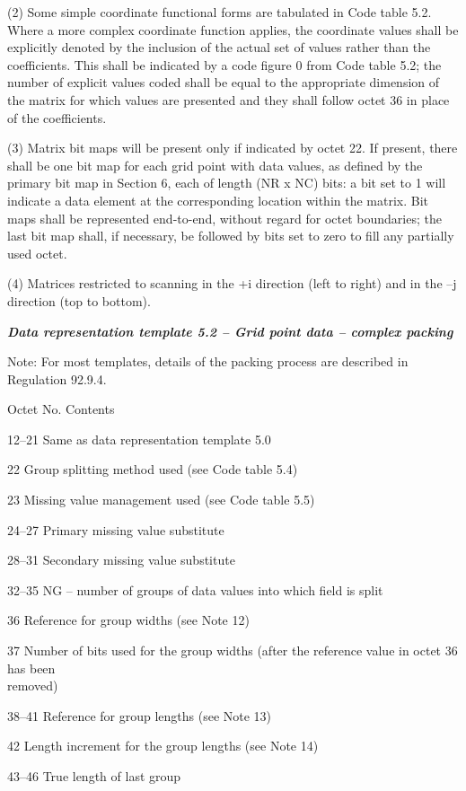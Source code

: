 (2) Some simple coordinate functional forms are tabulated in Code table 5.2. Where a more complex coordinate function applies, the coordinate values shall be explicitly denoted by the inclusion of the actual set of values rather than the coefficients. This shall be indicated by a code figure 0 from Code table 5.2; the number of explicit values coded shall be equal to the appropriate dimension of the matrix for which values are presented and they shall follow octet 36 in place of the coefficients.

(3) Matrix bit maps will be present only if indicated by octet 22. If present, there shall be one bit map for each grid point with data values, as defined by the primary bit map in Section 6, each of length (NR x NC) bits: a bit set to 1 will indicate a data element at the corresponding location within the matrix. Bit maps shall be represented end-to-end, without regard for octet boundaries; the last bit map shall, if necessary, be followed by bits set to zero to fill any partially used octet.

(4) Matrices restricted to scanning in the +i direction (left to right) and in the --j direction (top to bottom).

\emph{\textbf{Data representation template 5.2 -- Grid point data -- complex packing}}

Note: For most templates, details of the packing process are described in Regulation 92.9.4.

Octet No. Contents

12--21 Same as data representation template 5.0

22 Group splitting method used (see Code table 5.4)

23 Missing value management used (see Code table 5.5)

24--27 Primary missing value substitute

28--31 Secondary missing value substitute

32--35 NG -- number of groups of data values into which field is split

36 Reference for group widths (see Note 12)

37 Number of bits used for the group widths (after the reference value in octet 36 has been\\
removed)

38--41 Reference for group lengths (see Note 13)

42 Length increment for the group lengths (see Note 14)

43--46 True length of last group


